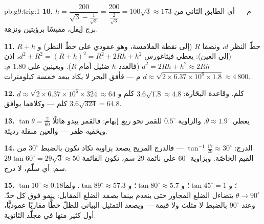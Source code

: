 \begin{solution}{pb:g9:trig:1}
\textbf{10.} $h = \dfrac{200}{\sqrt3 - \frac{1}{\sqrt3}}
= \dfrac{200}{\frac{2}{\sqrt3}} = 100\sqrt3 \approx 173$ م ---
أي الطابق الثاني من برج إيفل، مقيسًا برؤيتين ونزهة.

\textbf{11.} خطّ النظر $d$، ونصفا  $R$ (إلى نقطة الملامسة،
وهو عمودي على خطّ النظر) و $R + h$ (إلى العين): يعطي
فيثاغورس $d^2 + R^2 = (R + h)^2 = R^2 + 2Rh + h^2$، إذن
$d^2 = 2Rh + h^2 \approx 2Rh$ (فالعدد $h$ ضئيل أمام $R$).
وبعينين على $1.80$ م:
$d \approx \sqrt{2 \times 6.37 \times 10^6 \times 1.8}
\approx 4\,800$ م --- فأفق البحر لا يكاد يبعد خمسة
كيلومترات.

\textbf{12.} $d \approx \sqrt{2 \times 6.37 \times 10^6 \times
324} \approx 64$ كلم. وقاعدة البحّارة: $3.6\sqrt{1.8} \approx
4.8$ كلم و $3.6\sqrt{324} = 64.8$ كلم --- وكلاهما يوافق.

\textbf{13.} $\tan\theta = \frac{2}{60}$ يعطي $\theta \approx
1.9^\circ$. والزاوية $0.5^\circ$ للقمر نحو \emph{ربع} إبهام:
فالقمر يبدو هائلًا ويخفيه ظفر --- والعين منقلة رديئة.

\textbf{14.} الدرج: $\tan^{-1}\frac{17}{29} \approx 30^\circ$
--- فالدرج المريح يصعد بزاوية تكاد تكون بالضبط
$30^\circ$ من القيم الخاصّة. وبزاوية $60^\circ$ على نائمة $29$
سم، تكون القائمة $29\tan 60^\circ = 29\sqrt3 \approx
50$ سم: أي سلّم، لا درج.

\textbf{15.} $\tan 10^\circ \approx 0.18$؛
و $\tan 45^\circ = 1$؛ و $\tan 80^\circ \approx 5.7$؛
و $\tan 89^\circ \approx 57.3$. ولما $\theta \to 90^\circ$
يتضاءل الضلع المجاور حتى ينعدم بينما يصمد الضلع المقابل:
 ينمو فوق كل حدّ. وعند $90^\circ$ بالضبط لا مثلث
ولا قيمة --- ويصعد التمثيل البياني للظلّ خطًّا مقاربًا
عموديًّا، أول كثير منها في مجلّد الثانوية.
\end{solution}
